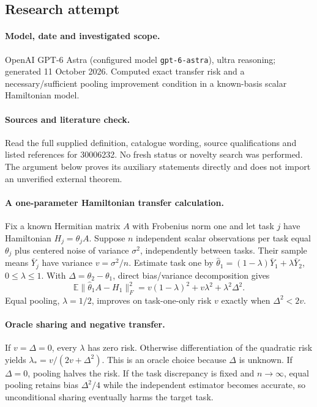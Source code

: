 \documentclass[11pt]{article}
\begin{document}
\subsection{Research attempt}
\paragraph{Model, date and investigated scope.}
OpenAI GPT-6 Astra (configured model \texttt{gpt-6-astra}), ultra reasoning; generated 11 October 2026. Computed exact transfer risk and a necessary/sufficient pooling improvement condition in a known-basis scalar Hamiltonian model.

\paragraph{Sources and literature check.}
Read the full supplied definition, catalogue wording, source qualifications and listed references for 30006232. No fresh status or novelty search was performed. The argument below proves its auxiliary statements directly and does not import an unverified external theorem.

\paragraph{A one-parameter Hamiltonian transfer calculation.} Fix a known Hermitian matrix \(A\) with Frobenius norm one and let task \(j\) have Hamiltonian \(H_j=\theta_j A\). Suppose \(n\) independent scalar observations per task equal \(\theta_j\) plus centered noise of variance \(\sigma^2\), independently between tasks. Their sample means \(\bar Y_j\) have variance \(v=\sigma^2/n\). Estimate task one by \(\widehat\theta_1=(1-\lambda)\bar Y_1+\lambda\bar Y_2\), \(0\leq\lambda\leq1\). With \(\Delta=\theta_2-\theta_1\), direct bias/variance decomposition gives
\[
 \mathbb E\|\widehat\theta_1A-H_1\|_F^2
 =v(1-\lambda)^2+v\lambda^2+\lambda^2\Delta^2.
\]
Equal pooling, \(\lambda=1/2\), improves on task-one-only risk \(v\) exactly when \(\Delta^2<2v\).
\paragraph{Oracle sharing and negative transfer.} If \(v=\Delta=0\), every \(\lambda\) has zero risk. Otherwise differentiation of the quadratic risk yields \(\lambda_*=v/(2v+\Delta^2)\). This is an oracle choice because \(\Delta\) is unknown. If \(\Delta=0\), pooling halves the risk. If the task discrepancy is fixed and \(n\to\infty\), equal pooling retains bias \(\Delta^2/4\) while the independent estimator becomes accurate, so unconditional sharing eventually harms the target task.
\end{document}
